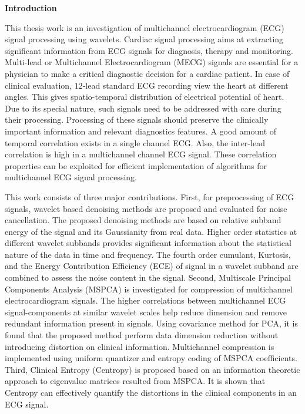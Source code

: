 \noindent \textbf{\Large{Introduction}}
\vspace{0.2in}

\noindent This thesis work is an investigation of multichannel
electrocardiogram (ECG) signal processing using wavelets. Cardiac
signal processing aims at extracting significant information from
ECG signals for diagnosis, therapy and monitoring. Multi-lead or
Multichannel Electrocardiogram (MECG) signals  are essential for a
physician to make a critical diagnostic decision for a cardiac
patient. In case of clinical evaluation, $12$-lead standard ECG
recording view the heart at different angles. This gives
spatio-temporal distribution of electrical potential of heart. Due
to its special nature, such signals need to be addressed with care
during their processing. Processing of these signals should
preserve the clinically important information and relevant
diagnostics features. A good amount of temporal correlation exists
in a single channel ECG. Also, the inter-lead correlation is high
in a multichannel channel ECG signal. These correlation properties
can be exploited for efficient implementation of algorithms for
multichannel ECG signal processing.

This work consists of three major contributions. First, for
preprocessing of ECG signals, wavelet based denoising methods are
proposed and evaluated for noise cancellation. The proposed
denoising methods are based on relative subband energy of the
signal and its Gaussianity from real data. Higher order statistics
at different wavelet subbands provides significant information
about the statistical nature of the data in time and frequency.
The fourth order cumulant, Kurtosis, and the Energy Contribution
Efficiency (ECE) of signal in a wavelet subband are combined to
assess the noise content in the signal. Second, Multiscale
Principal Components Analysis (MSPCA) is investigated for
compression of multichannel electrocardiogram signals.  The higher
correlations between multichannel ECG signal-components at similar
wavelet scales help reduce dimension and remove redundant
information present in signals. Using covariance method  for PCA,
it is found that the proposed method perform data dimension
reduction without introducing distortion on clinical information.
Multichannel compression is implemented using uniform quantizer
and entropy coding of MSPCA coefficients. Third, Clinical Entropy
(Centropy) is proposed   based on an information theoretic
approach to eigenvalue matrices resulted from MSPCA. It is shown
that Centropy can effectively quantify the  distortions in the
clinical components in an ECG signal.

